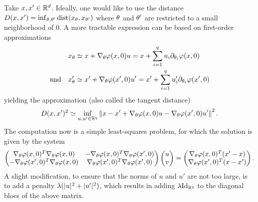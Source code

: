 Take $x, x'\in{\mathbb{R}}^d$. Ideally, one would like to use the distance $D(x,x') =
\inf_{\theta, \theta'} \operatorname{dist}(x_\theta, x_{\theta'})$ where $\theta$ and $\theta'$ are
restricted to a small neighborhood of 0. A more tractable
expression can be based on first-order approximations
\begin{align*}
&x_\theta \simeq x + \nabla_{\theta} \varphi(x,0) u = x + \sum_{i=1}^q u_i \partial_{\theta_i}\varphi(x,0)\\
\text{and}\quad & x'_\theta \simeq x' + \nabla_{\theta} \varphi(x',0) u' =x' + \sum_{i=1}^q u'_i \partial_{\theta_i}\varphi(x',0)
\end{align*}
yielding the approximation (also called the tangent distance)
$$
D(x, x')^2 \simeq \inf_{u,u'\in{\mathbb{R}}^q} \left\| x - x' + \nabla_{\theta} \varphi(x,0) u - \nabla_{\theta} \varphi(x',0)
u' \right\|^2.
$$
The computation now is a simple least-squares problem, for which the solution is
given by the system
$$
\begin{pmatrix} \nabla_\theta \varphi(x,0)^T\nabla_\theta \varphi(x,0) & -\nabla_\theta \varphi(x,0)^T\nabla_{\theta}\varphi(x',0)\\
-\nabla_{\theta}\varphi(x',0)^T\nabla_\theta \varphi(x,0) & \nabla_{\theta}\varphi(x',0)^T\nabla_{\theta}\varphi(x',0)\end{pmatrix} 
\begin{pmatrix}u\\ v\end{pmatrix} = 
\begin{pmatrix} \nabla_\theta \varphi(x,0)^T (x'-x) \\ \nabla_{\theta} \varphi(x',0)^T (x-x')\end{pmatrix}.
$$
A slight modification, to ensure that the norms of $u$ and $u'$ are
not too large, is to add a penalty $\lambda (|u|^2 + |u'|^2)$, which
results in adding $\la \Id[q]$ to the diagonal blocs of the above matrix.

